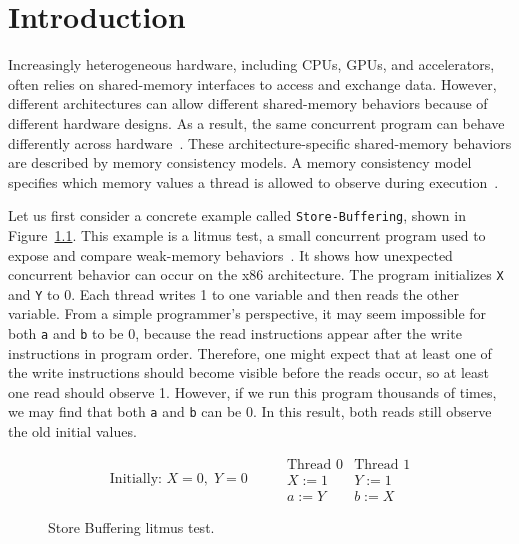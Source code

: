 \chapter{Introduction}
\label{chapter:introduction}

Increasingly heterogeneous hardware, including CPUs, GPUs, and accelerators, often relies on shared-memory interfaces to access and exchange data. However, different architectures can allow different shared-memory behaviors because of different hardware designs. As a result, the same concurrent program can behave differently across hardware~\cite{sewell2010x86tso,10.1145/3458926ArmedCat,DennisPhdThesis}. These architecture-specific shared-memory behaviors are described by memory consistency models. A memory consistency model specifies which memory values a thread is allowed to observe during execution~\cite{lam1675439}.

Let us first consider a concrete example called \texttt{Store-Buffering}, shown in Figure~\ref{fig:litmus-test}. This example is a litmus test, a small concurrent program used to expose and compare weak-memory behaviors~\cite{10.1145/2627752,sewell2010x86tso}. It shows how unexpected concurrent behavior can occur on the x86 architecture. The program initializes \texttt{X} and \texttt{Y} to 0. Each thread writes 1 to one variable and then reads the other variable. From a simple programmer's perspective, it may seem impossible for both \texttt{a} and \texttt{b} to be 0, because the read instructions appear after the write instructions in program order. Therefore, one might expect that at least one of the write instructions should become visible before the reads occur, so at least one read should observe 1. However, if we run this program thousands of times, we may find that both \texttt{a} and \texttt{b} can be 0. In this result, both reads still observe the old initial values.

\begin{figure}[h]
\centering
\[
\begin{array}{c}
\text{Initially: } X = 0,\; Y = 0
\end{array}
\qquad
\begin{array}{c|c}
\text{Thread 0} & \text{Thread 1} \\
\hline
X := 1          & Y := 1 \\
a := Y          & b := X
\end{array}
\]
\caption{Store Buffering litmus test.}
\label{fig:litmus-test}
\end{figure}

